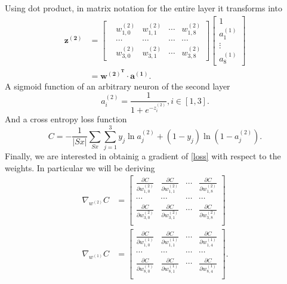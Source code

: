 \documentclass[a4paper,12pt,notitlepage]{article}
\begin{document}
Using dot product, in matrix notation for the entire layer it transforms into  
       \begin{equation*}
        \begin{split}
           \mathbf{z^{(2)}}&=\begin{bmatrix}
           &w_{1,0}^{(2)} &w_{1,1}^{(2)} &\cdots &w_{1,8}^{(2)} \\ 
           &\cdots &\cdots &\cdots &\cdots\\ 
           &w_{3,0}^{(2)} &w_{3,1}^{(2)} &\cdots &w_{3,8}^{(2)} 
        \end{bmatrix}
        \begin{bmatrix}
          1\\ 
          a_{1}^{(1)}\\ 
          \vdots \\ 
          a_{8}^{(1)}
       \end{bmatrix}\\
       &=\mathbf{w^{(2)^{T}}}\cdot \mathbf{a^{(1)}}.
       \end{split}
       \end{equation*}
A sigmoid function of an arbitrary neuron of the second layer \begin{equation*} a_{i}^{(2)}=\frac{1}{1+e^{-z_{i}^{(2)}}}, i \in [1,3]. \end{equation*}
And a cross entropy loss function
\begin{equation} \label{loss} C=-\frac{1}{|Sx|}\sum_{Sx}\sum_{j=1}^{3}y_{j}\ln a_{j}^{(2)} + (1-y_{j})\ln (1-a_{j}^{(2)}). \end{equation}
Finally, we are interested in obtainig a gradient of \eqref{loss} with respect to the weights. In particular we will be deriving
\begin{align} \label{gradw2}
\nabla_{w^{(2)}}C&=\begin{bmatrix}
 \frac{\partial C}{\partial w_{1,0}^{(2)}}& \frac{\partial C}{\partial w_{1,1}^{(2)}} &\cdots &\frac{\partial C}{\partial w_{1,8}^{(2)}}\\ 
 \cdots&\cdots&\cdots&\cdots \\
 \frac{\partial C}{\partial w_{3,0}^{(2)}}& \frac{\partial C}{\partial w_{3,1}^{(2)}} &\cdots &\frac{\partial C}{\partial w_{3,8}^{(2)}}\\ 
\end{bmatrix}\\ 
\label{gradw1}
 \nabla_{w^{(1)}}C&=\begin{bmatrix}
 \frac{\partial C}{\partial w_{1,0}^{(1)}}& \frac{\partial C}{\partial w_{1,1}^{(1)}} &\cdots &\frac{\partial C}{\partial w_{1,4}^{(1)}}\\ 
 \cdots&\cdots&\cdots&\cdots \\
 \frac{\partial C}{\partial w_{8,0}^{(1)}}& \frac{\partial C}{\partial w_{8,1}^{(1)}} &\cdots &\frac{\partial C}{\partial w_{8,4}^{(1)}}\\ 
\end{bmatrix}.
\end{align}
\end{document}
